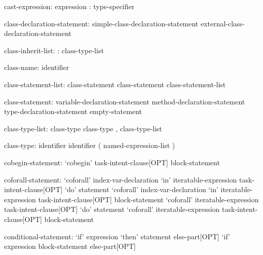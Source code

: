 \begin{syntax}
cast-expression:
  expression : type-specifier
\end{syntax}

\begin{syntax}
class-declaration-statement:
  simple-class-declaration-statement
  external-class-declaration-statement
\end{syntax}

\begin{syntax}
class-inherit-list:
  : class-type-list
\end{syntax}

\begin{syntax}
class-name:
  identifier
\end{syntax}

\begin{syntax}
class-statement-list:
  class-statement
  class-statement class-statement-list
\end{syntax}

\begin{syntax}
class-statement:
  variable-declaration-statement
  method-declaration-statement
  type-declaration-statement
  empty-statement
\end{syntax}

\begin{syntax}
class-type-list:
  class-type
  class-type , class-type-list
\end{syntax}

\begin{syntax}
class-type:
  identifier
  identifier ( named-expression-list )
\end{syntax}

\begin{syntax}
cobegin-statement:
  `cobegin' task-intent-clause[OPT] block-statement
\end{syntax}

\begin{syntax}
coforall-statement:
  `coforall' index-var-declaration `in' iteratable-expression task-intent-clause[OPT] `do' statement
  `coforall' index-var-declaration `in' iteratable-expression task-intent-clause[OPT] block-statement
  `coforall' iteratable-expression task-intent-clause[OPT] `do' statement
  `coforall' iteratable-expression task-intent-clause[OPT] block-statement
\end{syntax}

\begin{syntax}
conditional-statement:
  `if' expression `then' statement else-part[OPT]
  `if' expression block-statement else-part[OPT]
\end{syntax}

